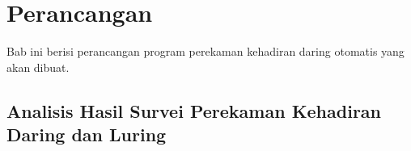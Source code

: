 \chapter{Perancangan}
\label{chap:perancangan}
Bab ini berisi perancangan program perekaman kehadiran daring otomatis yang akan dibuat.

\section{Analisis Hasil Survei Perekaman Kehadiran Daring dan Luring}
\label{sec:survei} 


